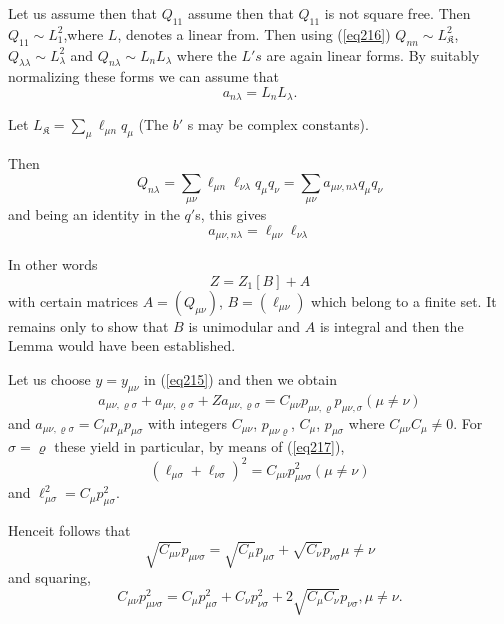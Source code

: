\medskip
{}
Let us assume then that $Q_{11}$ assume then that $Q_{11}$ is not
square free. Then $Q_{11} \sim L^2_1$,\pageoriginale where $L$,
denotes a linear from. Then using (\ref{eq216}) $Q_{n n}\sim
L^2_\mathfrak{K}$, $Q_{\lambda \lambda} \sim  
L_{\lambda}^{2}$ and $Q_{n \lambda} \sim L_{n} L_{\lambda}$ where the
$L's$ are again linear forms. By suitably normalizing these forms we
can assume that 
$$
a_{n \lambda} = L_{n}L_{\lambda}.
$$

Let $L_\mathfrak{K} = \sum\limits_{\mu} \ell_{\mu n}q_{\mu}$ (The $b'$ s may be
complex constants). 


Then
$$
Q_{n \lambda} = \sum_{\mu \nu} \ell_{\mu n} \ell _{\nu
  \lambda}q_{\mu}q_{\nu} = \sum_{\mu \nu} a_{\mu \nu, n
  \lambda}q_{\mu} q_{\nu} 
$$
and being an identity in the $q'$s, this gives
\begin{equation*}
a_{\mu \nu , n \lambda} = \ell _{\mu \nu } \ell _{\nu \lambda}
\tag{217}\label{eq217}  
\end{equation*}

In other words
\begin{equation*}
Z = Z_1 [B] + A \tag{218}\label{eq218} 
\end{equation*}
with certain matrices $A = (Q_{\mu \nu})$, $B = (\ell _{\mu \nu})$ which
belong to a finite set. It remains only to show that $B$ is unimodular
and $A$ is integral and then the Lemma would have been established.  

Let us choose $y = y_{\mu \nu}$ in (\ref{eq215}) and then we obtain 
$$
a_{\mu \nu, \varrho \sigma} + a_{\mu \nu, \varrho \sigma} + Z a_{\mu
  \nu, \varrho \sigma} = C_{\mu \nu} p_{\mu \nu, \varrho }p_{\mu \nu,
  \sigma} (\mu \neq \nu) 
$$
and $a_{\mu \nu, \varrho \sigma} = C_{\mu} p_{\mu} p_{\mu \sigma}$
with integers $C_{\mu \nu}$, $p_{\mu \nu \varrho}$, $C_{\mu}$, $p_{\mu
  \sigma}$ where $C_{\mu \nu } C_{\mu} \neq 0$. For $\sigma = \varrho$
these yield in particular, by means of (\ref{eq217}), 
$$
(\ell _{\mu \sigma} + \ell _{\nu \sigma})^2 = C_{\mu \nu}p^2 _{\mu \nu
  \sigma}(\mu \neq \nu) 
$$
and $\ell ^2 _{\mu \sigma} = C_{\mu} p^2_{\mu \sigma}$.

Hence\pageoriginale it follows that
\begin{equation*}
\sqrt{C_{\mu \nu}} p_{\mu \nu \sigma} =  \sqrt{C_{\mu}}p_{\mu \sigma}
+ \sqrt{C_{\nu}}p_{\nu \sigma} \mu \neq \nu  \tag{219}\label{eq219}  
\end{equation*}
and squaring,
\begin{equation*}
C_{\mu \nu} p^2_{\mu \nu \sigma} = C_{\mu} p^2_{\mu \sigma} + C_{\nu}
p^2_{\nu \sigma} + 2 \sqrt{C_{\mu}C_{\nu}} p_{\nu \sigma}, \mu \neq
\nu . \tag{220}\label{eq220}  
\end{equation*}

